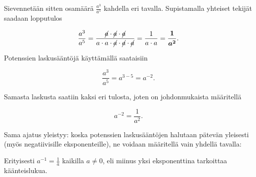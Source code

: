 Sievennetään sitten osamäärä $\frac{a^3}{a^5}$ kahdella eri tavalla. Supistamalla yhteiset tekijät saadaan lopputulos
    
    \begin{equation*}
        \frac{a^3}{a^5} =
        \frac{\cancel{a}\cdot \cancel{a}\cdot \cancel{a}}{a\cdot a\cdot
        \cancel{a}\cdot \cancel{a}\cdot \cancel{a}} = 
        \frac{1}{a\cdot a}=\boldsymbol{\frac{1}{a^2}}.
    \end{equation*}
    
Potenssien laskusääntöjä käyttämällä saataisiin
    
    \begin{equation*}
        \frac{a^3}{a^5} = a^{3-5}= a^{-2}.
    \end{equation*}
    
Samasta laskusta saatiin kaksi eri tulosta, joten on johdonmukaista määritellä
    
    \begin{equation*}
        a^{-2} = \frac{1}{a^2}.
    \end{equation*}

Sama ajatus yleistyy: koska potenssien laskusääntöjen halutaan pätevän yleisesti (myös negatiivisille eksponenteille), ne voidaan määritellä vain yhdellä tavalla:
  

Erityisesti $a^{-1}=\frac{1}{a}$ kaikilla $a \neq 0$, eli miinus yksi eksponenttina tarkoittaa käänteislukua.
    
\begin{esimerkki}
\end{esimerkki}

